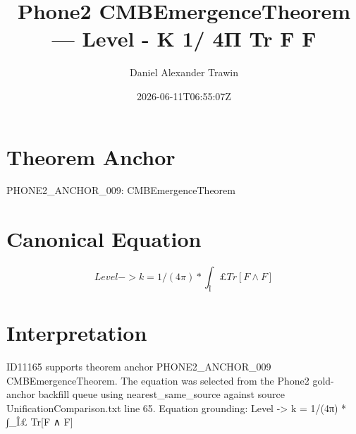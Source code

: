 \documentclass[11pt]{article}
\title{Phone2 CMBEmergenceTheorem — Level - K 1/ 4Π Tr F F}
\author{Daniel Alexander Trawin}
\date{2026-06-11T06:55:07Z}
\begin{document}
\maketitle
\section*{Theorem Anchor}
PHONE2_ANCHOR_009: CMBEmergenceTheorem
\section*{Canonical Equation}
\[
Level -> k = 1/(4π) * ∫_Î£ Tr[F ∧ F]
\]
\section*{Interpretation}
ID11165 supports theorem anchor PHONE2_ANCHOR_009 CMBEmergenceTheorem. The equation was selected from the Phone2 gold-anchor backfill queue using nearest_same_source against source UnificationComparison.txt line 65. Equation grounding: Level -> k = 1/(4π) * ∫_Î£ Tr[F ∧ F]
\end{document}
